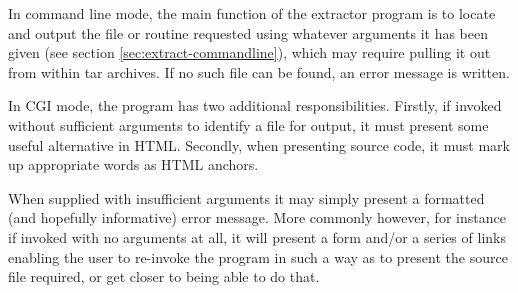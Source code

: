 \documentclass[twoside,11pt]{article}
\renewcommand{\_}{\texttt{\symbol{95}}}
\begin{document}
In command line mode, the main function of the extractor
program is to locate and output
the file or routine requested using whatever arguments it
has been given (see section \ref{sec:extract-commandline}),
which may require pulling it out from within tar archives.
If no such file can be found, an error message is written.

In CGI mode, the program has two additional responsibilities.
Firstly, if invoked without sufficient arguments to identify 
a file for output, it must present some useful alternative in HTML.
Secondly, when presenting source code, it must mark up 
appropriate words as HTML anchors.

When supplied with insufficient arguments it may simply present
a formatted (and hopefully informative) error message. 
More commonly however, for instance if invoked with no arguments
at all, it will present a form and/or a series of links 
enabling the user to re-invoke the program 
in such a way as to present the source file required,
or get closer to being able to do that.
\end{document}
